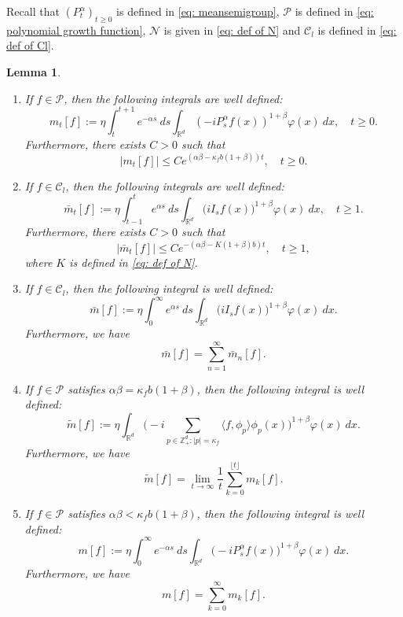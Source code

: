 \documentclass[12pt,a4paper]{amsart}
\theoremstyle{plain}
\newtheorem{lem}[thm]{Lemma}
\theoremstyle{definition}
\numberwithin{equation}{section}
\begin{document}
   Recall that
    $(P^\alpha_t)_{t\geq 0}$ is defined in \eqref{eq: meansemigroup}, $\mathcal P$ is defined in \eqref{eq: polynomial growth function}, $\mathcal N$ is given in \eqref{eq: def of N} and $\mathcal C_l$ is defined in \eqref{eq: def of Cl}.
\begin{lem}
\label{lem: def of all m}
\begin{enumerate}
\item
If $f\in\mathcal{P}$, then the following integrals are well defined:
\[
	m_t[f]
        := \eta \int_t^{t+1}e^{-\alpha s}~ds\int_{\mathbb R^d} (-iP_{s}^\alpha f(x))^{1+\beta} \varphi(x)~dx,
    \quad t\geq 0.
\]
	Furthermore, there exists  $C>0$ such that
\begin{equation}\label{domi-m}
    |m_t[f]|
    \leq C e^{(\alpha\beta-\kappa_fb(1+\beta))t},
    \quad t\geq 0.
\end{equation}
\item
If $f\in\mathcal C_l$, then the following integrals are well defined:
\[
    \bar{m}_t[f]
    := \eta \int_{t-1}^{t} e^{\alpha s}~ds \int_{\mathbb R^d}\big(iI_sf(x)\big)^{1+\beta} \varphi(x)~dx, \quad t\geq 1.
\]
    Furthermore, there exists  $C>0$ such that
\begin{equation}
    |\bar{m}_t[f]| \leq C e^{-(\alpha\beta-K(1+\beta)b)t}, \quad t\geq 1,
\end{equation}
where $K$ is defined in \eqref{eq: def of N}.
\item
If $f \in \mathcal C_l$, then the following integral is well defined:
\[
    \bar{m}[f]
   :=\eta \int_{0}^{\infty} e^{\alpha s}~ds \int_{\mathbb R^d} \big(iI_sf(x)\big)^{1+\beta}\varphi(x)~dx.
\]
    Furthermore, we have
\begin{equation}\label{sum-bar-m}
    \bar{m}[f]
    =\sum_{n=1}^{\infty}\bar{m}_n[f].
\end{equation}
\item
If $f \in \mathcal{P}$ satisfies  $\alpha\beta=\kappa_f b(1+\beta)$, then the following integral is well defined:
\[
	\widetilde{m}[f]
    := \eta\int_{\mathbb R^d} \Big(-i\sum_{p\in \mathbb Z_+^d:|p|=\kappa_f}\langle f,\phi_p\rangle\phi_p(x)\Big)^{1+\beta} \varphi(x)~dx.
\]
	Furthermore, we have
\begin{equation}
\label{para: critical case}
	\widetilde{m}[f] = \lim_{t\rightarrow \infty}\frac{1}{t}\sum_{k=0}^{\lfloor t \rfloor}m_k[f].
\end{equation}
\item
If $f\in \mathcal{P}$ satisfies $\alpha\beta<\kappa_fb(1+\beta)$, then the following integral is well defined:
\[
    m[f]
    :=\eta \int_0^{\infty} e^{-\alpha s} ~ds\int_{\mathbb R^d} \big(-iP_s^\alpha f(x)\big)^{1+\beta} \varphi(x)~dx.
\]
	Furthermore, we have
\begin{equation}\label{sum-m}
	m[f]
    =\sum_{k=0}^\infty m_k[f].
\end{equation}
\end{enumerate}
\end{lem}
\end{document}
